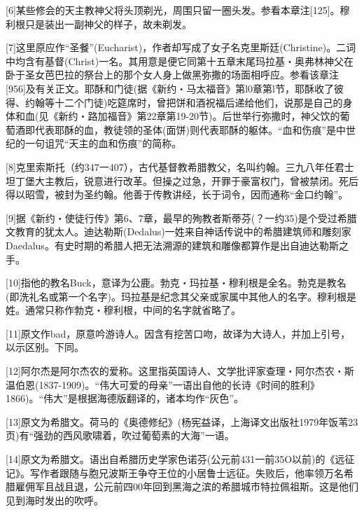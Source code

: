 \documentclass{article}
\begin{document}
[6]某些修会的天主教神父将头顶剃光，周围只留一圈头发。参看本章注[125]。穆利根只是装出一副神父的样子，故未剃发。



[7]这里原应作“圣餐”(Eucharist)，作者却写成了女子名克里斯廷(Christine)。二词中均含有基督(Christ)一名。其用意是便它同第十五章末尾玛拉基・奥弗林神父在卧于圣女芭巴拉的祭台上的那个女人身上做黑弥撒的场面相呼应。参看该章注[956]及有关正文。耶酥和门徒(据《新约・马太福音》第l0章第l节，耶酥收了彼得、约翰等十二个门徒)吃筵席时，曾把饼和酒祝福后递给他们，说那是自己的身体和血(见《新约・路加福音》第22章第19-20节)。后世举行弥撒时，神父饮的葡萄酒即代表耶酥的血，教徒领的圣体(面饼)则代表耶酥的躯体。“血和伤痕”是中世纪的一句诅咒“天主的血和伤痕”的简称。



[8]克里索斯托（约347一407），古代基督教希腊教父，名叫约翰。三九八年任君士坦丁堡大主教后，锐意进行改革。但操之过急，开罪于豪富权门，曾被禁闭。死后得以昭雪，被封为圣约翰。他善于传教讲经，长于词令，因而通称“金口约翰”。



[9]据《新约・使徒行传》第6、7章，最早的殉教者斯蒂芬(？一约35)是个受过希腊文教育的犹太人。迪达勒斯(Dedalus)一姓来自神话传说中的希腊建筑师和雕刻家Daedalus。有史时期的希腊人把无法溯源的建筑和雕像都算作是出自迪达勒斯之手。



[10]指他的教名Buck，意译为公鹿。勃克・玛拉基・穆利根是全名。勃克是教名(即洗礼名或第一个名字)。玛拉基是纪念其父亲或家属中其他人的名字。穆利根是姓。通常只称作勃克・穆利根，中间的名字就省略了。



[11]原文作bad，原意吟游诗人。因含有挖苦口吻，故译为大诗人，并加上引号，以示区别。下同。



[12]阿尔杰是阿尔杰农的爱称。这里指英国诗人、文学批评家查理・阿尔杰农・斯温伯恩(1837-1909)。“伟大可爱的母亲”一语出自他的长诗《时间的胜利》1866)。“伟大”是根据海德版翻译的，诸本均作“灰色”。



[13]原文为希腊文。荷马的《奥德修纪》(杨宪益译，上海译文出版社1979年饭苇23页)有“强劲的西风歌啸着，吹过葡萄素的大海”一语。



[14]原文为希腊文。语出自希腊历史学家色诺芬(公元前431一前35O以前)的《远征记》。写作者跟随与胞兄波斯王争夺王位的小居鲁士远征。失败后，他率领万名希腊雇佣军且战且退，公元前四00年回到黑海之滨的希腊城市特拉佩祖斯。这是他们见到海时发出的吹呼。
\end{document}
